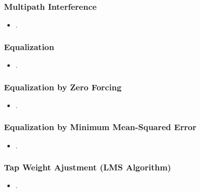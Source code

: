 \documentclass{beamer}
\begin{document}
\begin{frame}
	\frametitle{Multipath Interference}
	\begin{itemize}
		\item .
	\end{itemize}
\end{frame}


\begin{frame}
	\frametitle{Equalization}
	\begin{itemize}
		\item .
	\end{itemize}
\end{frame}

\begin{frame}
	\frametitle{Equalization by Zero Forcing}
	\begin{itemize}
		\item .
	\end{itemize}
\end{frame}

\begin{frame}
	\frametitle{Equalization by Minimum Mean-Squared Error}
	\begin{itemize}
		\item .
	\end{itemize}
\end{frame}

\begin{frame}
	\frametitle{Tap Weight Ajustment (LMS Algorithm)}
	\begin{itemize}
		\item .
	\end{itemize}
\end{frame}
\end{document}
